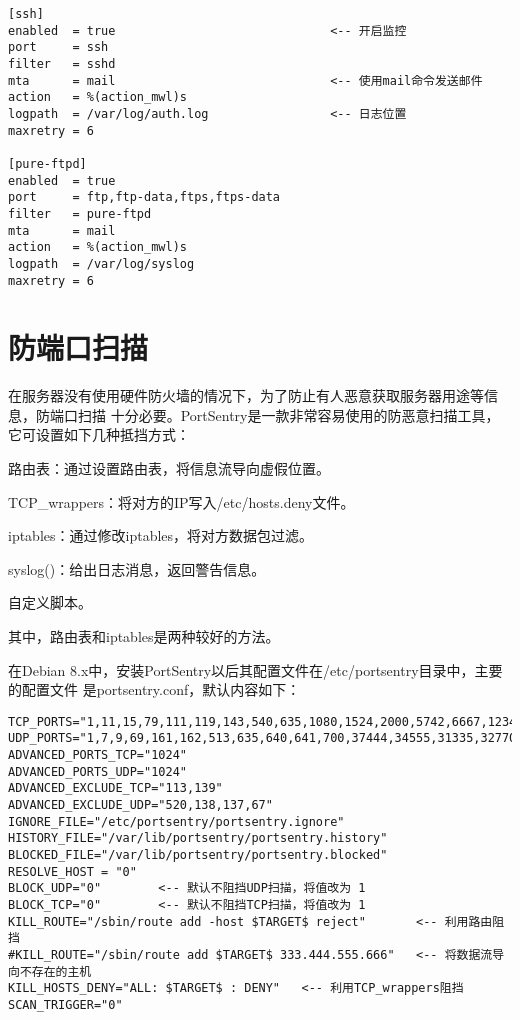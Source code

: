 \begin{Verbatim}[]
[ssh]
enabled  = true                              <-- 开启监控
port     = ssh
filter   = sshd
mta      = mail                              <-- 使用mail命令发送邮件
action   = %(action_mwl)s
logpath  = /var/log/auth.log                 <-- 日志位置
maxretry = 6

[pure-ftpd]
enabled  = true
port     = ftp,ftp-data,ftps,ftps-data
filter   = pure-ftpd
mta      = mail
action   = %(action_mwl)s
logpath  = /var/log/syslog
maxretry = 6
\end{Verbatim}

\section{防端口扫描}

在服务器没有使用硬件防火墙的情况下，为了防止有人恶意获取服务器用途等信息，防端口扫描%
十分必要。PortSentry是一款非常容易使用的防恶意扫描工具，它可设置如下几种抵挡方式：

\begin{itemize*}
  \item 路由表：通过设置路由表，将信息流导向虚假位置。
  \item TCP\_wrappers：将对方的IP写入/etc/hosts.deny文件。
  \item iptables：通过修改iptables，将对方数据包过滤。
  \item syslog()：给出日志消息，返回警告信息。
  \item 自定义脚本。
\end{itemize*}

其中，路由表和iptables是两种较好的方法。

在Debian 8.x中，安装PortSentry以后其配置文件在/etc/portsentry目录中，主要的配置文件%
是portsentry.conf，默认内容如下：

\begin{Verbatim}[]
TCP_PORTS="1,11,15,79,111,119,143,540,635,1080,1524,2000,5742,6667,12345,12346,20034
UDP_PORTS="1,7,9,69,161,162,513,635,640,641,700,37444,34555,31335,32770,32771,32772,
ADVANCED_PORTS_TCP="1024"
ADVANCED_PORTS_UDP="1024"
ADVANCED_EXCLUDE_TCP="113,139"
ADVANCED_EXCLUDE_UDP="520,138,137,67"
IGNORE_FILE="/etc/portsentry/portsentry.ignore"
HISTORY_FILE="/var/lib/portsentry/portsentry.history"
BLOCKED_FILE="/var/lib/portsentry/portsentry.blocked"
RESOLVE_HOST = "0"
BLOCK_UDP="0"        <-- 默认不阻挡UDP扫描，将值改为 1
BLOCK_TCP="0"        <-- 默认不阻挡TCP扫描，将值改为 1
KILL_ROUTE="/sbin/route add -host $TARGET$ reject"       <-- 利用路由阻挡
#KILL_ROUTE="/sbin/route add $TARGET$ 333.444.555.666"   <-- 将数据流导向不存在的主机
KILL_HOSTS_DENY="ALL: $TARGET$ : DENY"   <-- 利用TCP_wrappers阻挡
SCAN_TRIGGER="0"
\end{Verbatim}


